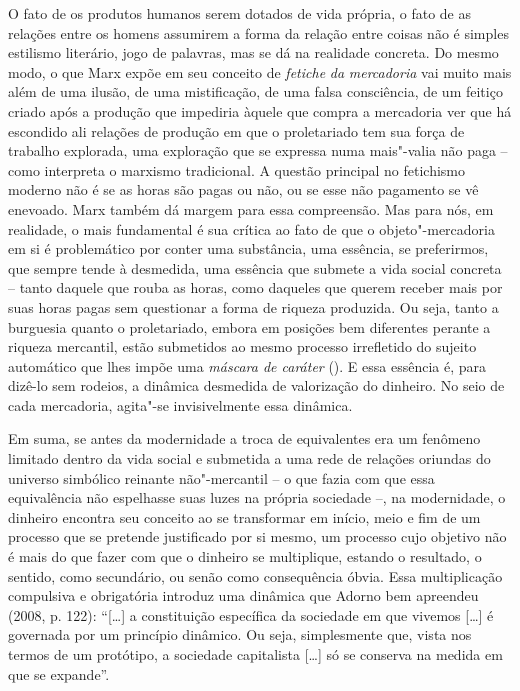 O fato de os produtos humanos serem dotados de vida própria, o fato de
as relações entre os homens assumirem a forma da relação entre coisas
não é simples estilismo literário, jogo de palavras, mas se dá na
realidade concreta. Do mesmo modo, o que Marx expõe em seu conceito de
\emph{fetiche} \emph{da} \emph{mercadoria} vai muito mais além de uma
ilusão, de uma mistificação, de uma falsa consciência, de um feitiço
criado após a produção que impediria àquele que compra a mercadoria ver
que há escondido ali relações de produção em que o proletariado tem sua
força de trabalho explorada, uma exploração que se expressa numa
mais"-valia não paga -- como interpreta o marxismo tradicional. A questão
principal no fetichismo moderno não é se as horas são pagas ou não, ou
se esse não pagamento se vê enevoado. Marx também dá margem para essa
compreensão. Mas para nós, em realidade, o mais fundamental é sua
crítica ao fato de que o objeto"-mercadoria em si é problemático por
conter uma substância, uma essência, se preferirmos, que sempre tende à
desmedida, uma essência que submete a vida social concreta -- tanto
daquele que rouba as horas, como daqueles que querem receber mais por
suas horas pagas sem questionar a forma de riqueza produzida. Ou seja,
tanto a burguesia quanto o proletariado, embora em posições bem
diferentes perante a riqueza mercantil, estão submetidos ao mesmo
processo irrefletido do sujeito automático que lhes impõe uma
\emph{máscara de caráter} (). E essa essência é, para dizê-lo sem
rodeios, a dinâmica desmedida de valorização do dinheiro. No seio de
cada mercadoria, agita"-se invisivelmente essa dinâmica.

Em suma, se antes da modernidade a troca de equivalentes era um fenômeno
limitado dentro da vida social e submetida a uma rede de relações
oriundas do universo simbólico reinante não"-mercantil -- o que fazia com
que essa equivalência não espelhasse suas luzes na própria sociedade --,
na modernidade, o dinheiro encontra seu conceito ao se transformar em
início, meio e fim de um processo que se pretende justificado por si
mesmo, um processo cujo objetivo não é mais do que fazer com que o
dinheiro se multiplique, estando o resultado, o sentido, como
secundário, ou senão como consequência óbvia. Essa multiplicação
compulsiva e obrigatória introduz uma dinâmica que Adorno bem apreendeu
(2008, p. 122): ``[\ldots{}] a constituição específica da sociedade em
que vivemos [\ldots{}] é governada por um princípio dinâmico. Ou seja,
simplesmente que, vista nos termos de um protótipo, a sociedade
capitalista [\ldots{}] só se conserva na medida em que se expande''.

